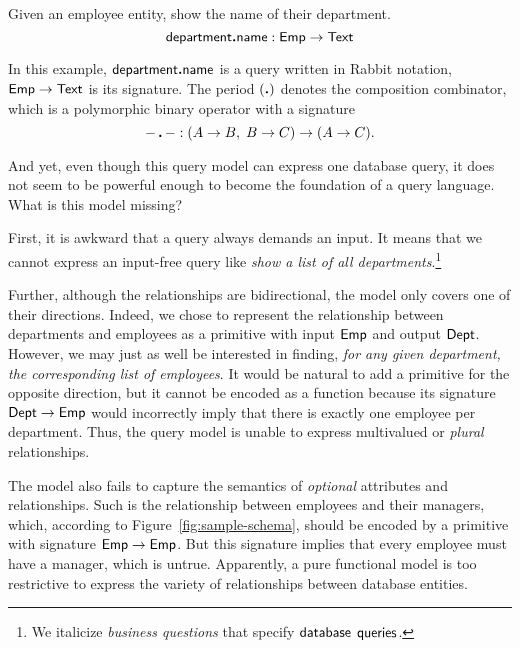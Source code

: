 \begin{demo}
    \label{ex:composite-query}
    Given an employee entity, show the name of their department.
    \begin{equation*}
        \mathsf{department}\boldsymbol{.}\mathsf{name}: \mathsf{Emp} \to \mathsf{Text}
    \end{equation*}
\end{demo}

In this example, $\mathsf{department}\boldsymbol{.}\mathsf{name}$ is a query written in Rabbit notation,
$\mathsf{Emp} \to \mathsf{Text}$ is its signature.  The period $(\boldsymbol{.})$ denotes the composition
combinator, which is a polymorphic binary operator with a signature
\begin{equation*}
        {-}\,\boldsymbol{.}\,{-} : (A \to B,\; B \to C) \to (A \to C).
\end{equation*}

And yet, even though this query model can express one database query, it does
not seem to be powerful enough to become the foundation of a query language.
What is this model missing?

First, it is awkward that a query always demands an input.  It means that we
cannot express an input-free query like \emph{show a list of all
departments}.\footnote{We italicize \emph{business questions} that specify
$\mathsf{database}$ $\mathsf{queries}$.}

Further, although the relationships are bidirectional, the model only covers
one of their directions.  Indeed, we chose to represent the relationship
between departments and employees as a primitive with input $\mathsf{Emp}$ and output
$\mathsf{Dept}$.  However, we may just as well be interested in finding, \emph{for any
given department, the corresponding list of employees}.  It would be natural to
add a primitive for the opposite direction, but it cannot be encoded as a
function because its signature $\mathsf{Dept} \to \mathsf{Emp}$ would incorrectly imply that
there is exactly one employee per department.  Thus, the query model is unable
to express multivalued or \emph{plural} relationships.

The model also fails to capture the semantics of \emph{optional} attributes and
relationships.  Such is the relationship between employees and their managers,
which, according to Figure~\ref{fig:sample-schema}, should be encoded by a
primitive with signature $\mathsf{Emp} \to \mathsf{Emp}$.  But this signature implies that
every employee must have a manager, which is untrue.  Apparently, a pure
functional model is too restrictive to express the variety of relationships
between database entities.

